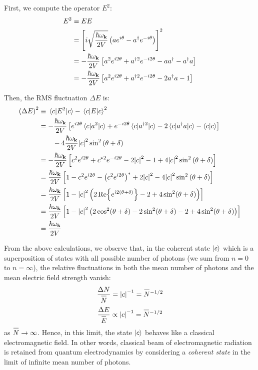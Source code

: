 \documentclass[letterpaper,12pt]{article}
\newenvironment{problem}{\subsection{}\begin{adjustwidth}{0.25in}{}\vspace{-\baselineskip}}{\end{adjustwidth}}
\newenvironment{subproblem}{\subsubsection{}\begin{adjustwidth}{0.4in}{}\vspace{-\baselineskip}}{\end{adjustwidth}}
\newcommand{\define}{\equiv}
\newcommand{\overbar}[1]{
	\mkern 1.5mu \overline{\mkern-1.5mu\raisebox{0pt}[\dimexpr\height+0.5mm\relax]{$#1$}\mkern-1.5mu}\mkern 1.5mu
}
\begin{document}
\begin{problem}
\begin{subproblem}
	First, we compute the operator $E^2$:
	\begin{align*}
		E^2 &\define EE	\\
		&= \left[i\sqrt{\frac{\hbar\omega_{\vb{k}}}{2V}}
		\left(ae^{i\theta} - a^\dagger e^{-i\theta}\right)\right]^2	\\
		&= -\frac{\hbar\omega_{\vb{k}}}{2V}\left[a^2 e^{i2\theta} + a^{\dagger2}e^{-i2\theta} - aa^\dagger - a^\dagger a\right]	\\
		&= -\frac{\hbar\omega_{\vb{k}}}{2V}\left[a^2 e^{i2\theta} + a^{\dagger2}e^{-i2\theta} - 2a^\dagger a - 1\right]
	\end{align*}
	
	Then, the RMS fluctuation $\Delta E$ is:
	\begin{align*}
		\left(\Delta E\right)^2 &\define
		\ev{E^2}{c} - \ev{E}{c}^2	\\
		&= -\frac{\hbar\omega_{\vb{k}}}{2V}\left[e^{i2\theta}\ev{a^2}{c} + e^{-i2\theta}\ev{a^{\dagger2}}{c} - 2\ev{a^\dagger a}{c} - \braket{c}\right]	\\
		&\qquad - 4\frac{\hbar\omega_{\vb{k}}}{2V}\abs{c}^2\sin^2\left(\theta + \delta\right)	\\
		&= -\frac{\hbar\omega_{\vb{k}}}{2V}\left[c^2e^{i2\theta} + c^{*2}e^{-i2\theta} - 2\abs{c}^2 - 1 + 4\abs{c}^2\sin^2\left(\theta+\delta\right) \right]	\\
		&= \frac{\hbar\omega_{\vb{k}}}{2V}
		\left[1 - c^2e^{i2\theta} - \left(c^2e^{i2\theta}\right)^* + 2\abs{c}^2 - 4\abs{c}^2\sin^2\left(\theta+\delta\right)\right]	\\
		&= \frac{\hbar\omega_{\vb{k}}}{2V}
		\left[1 - \abs{c}^2\left(2\Re{e^{i2(\theta+\delta)}} - 2 + 4\sin^2(\theta+\delta)\right) \right]	\\
		&= \frac{\hbar\omega_{\vb{k}}}{2V}
		\left[1 - \abs{c}^2\left(2\cos^2(\theta+\delta)-2\sin^2(\theta+\delta) - 2 + 4\sin^2(\theta+\delta)\right)\right]	\\
		&= \frac{\hbar\omega_{\vb{k}}}{2V}		 
	\end{align*}
\end{subproblem}

From the above calculations, we observe that, in the coherent state $\ket{c}$ which is a superposition of states with all possible number of photons (we sum from $n=0$ to $n=\infty$), the relative fluctuations in both the mean number of photons and the mean electric field strength vanish:
\begin{gather*}
	\frac{\Delta N}{\overbar{N}} = \abs{c}^{-1} = \overbar{N}^{-1/2}	\\[0.5ex]
	\frac{\Delta E}{\overbar{E}} \propto \abs{c}^{-1} = \overbar{N}^{-1/2}
\end{gather*}
as $\overbar{N} \rightarrow \infty$. Hence, in this limit, the state $\ket{c}$ behaves like a classical electromagnetic field. In other words, classical beam of electromagnetic radiation is retained from quantum electrodynamics by considering a \emph{coherent state} in the limit of infinite mean number of photons.
\end{problem}
\end{document}
